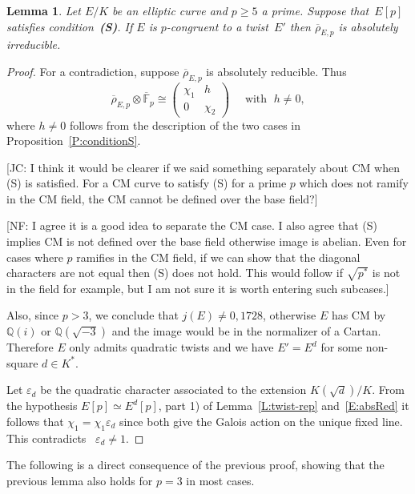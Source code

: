 \documentclass[12pt, reqno]{amsart}
\newcommand{\F}{\mathbb{F}}
\newcommand{\Fbar}{{\overline{\F}}}
\newcommand{\Q}{\mathbb{Q}}
\newcommand{\rhobar}{{\overline{\rho}}}
\newcommand{\eps}{\varepsilon}
\numberwithin{equation}{section}
\newtheorem{lemma}[theorem]{Lemma}
\theoremstyle{definition}
\theoremstyle{remark}
\newcommand{\nf}[1]{{\color{blue} \textsf{[NF: #1]}}}
\newcommand{\jc}[1]{{\color{darkgreen} \textsf{[JC: #1]}}}
\begin{document}
\begin{lemma} \label{L:noCyclic}
Let $E/K$ be an elliptic curve and $p \geq 5$ a prime. Suppose that~$E[p]$ satisfies condition~{\bf (S)}. 
If $E$ is $p$-congruent to a twist~$E'$ then $\rhobar_{E,p}$ is absolutely irreducible.
\end{lemma}
\begin{proof}
For a contradiction, suppose $\rhobar_{E,p}$ is absolutely reducible. Thus
\begin{equation} \label{E:absRed}
  \rhobar_{E,p} \otimes \Fbar_p \cong 
 \begin{pmatrix}
 \chi_1 & h \\ 0 &\chi_2
 \end{pmatrix} \quad \text{ with } \; h \neq 0, 
\end{equation} 
where $h \neq 0$ follows from 
the description of the two cases
in Proposition~\ref{P:conditionS}.

\jc{I think it would be clearer if we said something separately about
  CM when (S) is satisfied.  For a CM curve to satisfy (S) for a prime
$p$ which does not ramify in the CM field, the CM cannot be defined
  over the base field?}
  
\nf{I agree it is a good idea to separate the CM case. I also agree that (S) implies CM is not defined over the base field otherwise image is abelian. Even for cases where $p$ ramifies in the CM field, if we can show that the diagonal characters are not equal then (S) does not hold. This would follow if $\sqrt{p^*}$ is not in the field for example, but I am not sure it is worth entering such subcases.} 

  
  
Also, since $p > 3$, we conclude that $j(E) \neq 0, 1728$, 
otherwise $E$ has CM by~$\Q(i)$ or $\Q(\sqrt{-3})$ and the image would be in the normalizer of a Cartan. Therefore $E$ only admits quadratic twists and we have $E' = E^d$ for some non-square $d \in K^*$.

Let $\eps_d$ be the quadratic character associated to the extension
$K(\sqrt{d})/K$. From 
the hypothesis  
$E[p] \simeq E^d[p]$, 
part 1) of Lemma~\ref{L:twist-rep}
and~\eqref{E:absRed} it follows that
$\chi_1 =\chi_1\eps_d$
since both give the Galois action on the unique fixed line. This contradicts ~$\eps_d \neq 1$.
\end{proof}

The following is a direct consequence of the previous proof, showing that the previous lemma also holds for $p=3$ in most cases.
\end{document}

